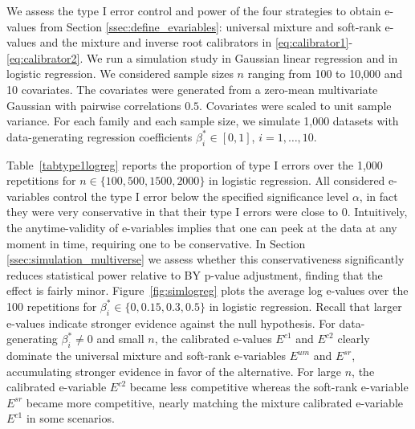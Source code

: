 \documentclass[pdflatex,sn-mathphys-num]{sn-jnl}%
\theoremstyle{thmstyleone}%
\theoremstyle{thmstyletwo}%
\theoremstyle{thmstylethree}%
\newcommand{\david}[1]{{\small{\color{blue} \sf $\heartsuit$ [David: #1]}}}
\begin{document}
We assess the type I error control and power of the four strategies to obtain e-values from Section \ref{ssec:define_evariables}: universal mixture and soft-rank e-values and the mixture and inverse root calibrators in \eqref{eq:calibrator1}-\eqref{eq:calibrator2}. We run a simulation study in Gaussian linear regression and in logistic regression. We considered sample sizes $n$ ranging from 100 to 10,000 and 10 covariates. The covariates were generated from a zero-mean multivariate Gaussian with pairwise correlations $0.5$. Covariates were scaled to unit sample variance. For each family and each sample size, we simulate \color{blue} 1,000 \color{black} datasets with data-generating regression coefficients $\beta_i^*\in[0,1]$, $i=1,\ldots,10$.

Table~\ref{tabtype1logreg} reports the proportion of type I errors over the \color{blue} 1,000 \color{black} repetitions for $n \in \{100, 500, 1500, 2000\}$ in logistic regression. All considered e-variables control the type I error below the specified significance level $\alpha$, in fact they \color{blue} were very conservative in that their type I errors were close to 0. Intuitively, the anytime-validity of e-variables implies that one can peek at the data at any moment in time, requiring one to be conservative. In Section \ref{ssec:simulation_multiverse} we assess whether this conservativeness significantly reduces statistical power relative to BY p-value adjustment, finding that the effect is fairly minor. \color{black}
Figure~\ref{fig:simlogreg} plots the average log e-values over the 100 repetitions for $\beta_i^*\in \{0, 0.15, 0.3, 0.5\}$ in logistic regression. Recall that larger e-values indicate stronger evidence against the null hypothesis. For data-generating $\beta_i^* \neq 0$ and small $n$, the calibrated e-values $E^{c1}$ and $E^{c2}$ clearly dominate the universal mixture and soft-rank e-variables $E^{um}$ and $E^{sr}$, accumulating stronger evidence in favor of the alternative. For large $n$, the calibrated e-variable $E^{c2}$ became less competitive whereas the soft-rank e-variable $E^{sr}$ became more competitive, nearly matching the mixture calibrated e-variable $E^{c1}$ in some scenarios. 
\end{document}
